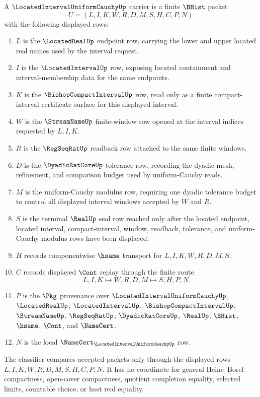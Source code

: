 \begin{definition}
\label{def:located-interval-uniform-cauchy-carrier}
A $\LocatedIntervalUniformCauchyUp$ carrier is a finite $\BHist$ packet
$$
U=(L,I,K,W,R,D,M,S,H,C,P,N)
$$
with the following displayed rows:
\begin{enumerate}
\item $L$ is the $\LocatedRealUp$ endpoint row, carrying the lower and upper located real names used by the interval request.
\item $I$ is the $\LocatedIntervalUp$ row, exposing located containment and interval-membership data for the same endpoints.
\item $K$ is the $\BishopCompactIntervalUp$ row, read only as a finite compact-interval certificate surface for this displayed interval.
\item $W$ is the $\StreamNameUp$ finite-window row opened at the interval indices requested by $L,I,K$.
\item $R$ is the $\RegSeqRatUp$ readback row attached to the same finite windows.
\item $D$ is the $\DyadicRatCoreUp$ tolerance row, recording the dyadic mesh, refinement, and comparison budget used by uniform-Cauchy reads.
\item $M$ is the uniform-Cauchy modulus row, requiring one dyadic tolerance budget to control all displayed interval windows accepted by $W$ and $R$.
\item $S$ is the terminal $\RealUp$ seal row reached only after the located endpoint, located interval, compact-interval, window, readback, tolerance, and uniform-Cauchy modulus rows have been displayed.
\item $H$ records componentwise $\hsame$ transport for $L,I,K,W,R,D,M,S$.
\item $C$ records displayed $\Cont$ replay through the finite route
$$
L,I,K \longmapsto W,R,D,M \longmapsto S,H,P,N .
$$
\item $P$ is the $\Pkg$ provenance over $\LocatedIntervalUniformCauchyUp$, $\LocatedRealUp$, $\LocatedIntervalUp$, $\BishopCompactIntervalUp$, $\StreamNameUp$, $\RegSeqRatUp$, $\DyadicRatCoreUp$, $\RealUp$, $\BHist$, $\hsame$, $\Cont$, and $\NameCert$.
\item $N$ is the local $\NameCert_{\LocatedIntervalUniformCauchyUp}$ row.
\end{enumerate}
The classifier compares accepted packets only through the displayed rows $L,I,K,W,R,D,M,S,H,C,P,N$. It has no coordinate for general Heine--Borel compactness, open-cover compactness, quotient completion equality, selected limits, countable choice, or host real equality.
\end{definition}

